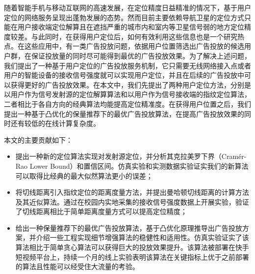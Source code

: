\begin{cabstract}
  随着智能手机与移动互联网的高速发展，在定位精度日益精准的情况下，基于用户定位的网络服务呈现出蓬勃发展的态势。然而目前主要依赖导航卫星的定位方式只能在用户接收端定位解算且在遮挡严重的城市内和室内等卫星信号弱的地方定位精度较差。与此同时，在获得用户定位后，如何有效利用这些信息也是一个研究热点。在这些应用中，有一类广告投放问题，依据用户位置筛选出广告投放的候选用户群，在保证投放量的同时尽可能得到最优的广告投放效果。为了解决上述问题，我们提出了一种基于用户定位的广告投放服务机制，它只需要无线网络接入点或者用户的智能设备的接收信号强度就可以实现用户定位，并且在后续的广告投放中可以获得更好的广告投放效果。在本文中，我们先提出了两种用户定位方法，分别是以用户作为信号发射源的定位解算算法和以用户作为信号接收端的指纹定位算法，二者相比于各自方向的经典算法均能提高定位精准度。在获得用户位置之后，我们提出一种基于凸优化的保量推荐下的最优广告投放算法，在提高广告投放效果的同时还有较低的在线计算复杂度。

  本文的主要贡献如下：
  \begin{itemize}
    \item 提出一种新的定位算法实现对发射源定位，并分析其克拉美罗下界（Cram\'{e}r-Rao Lower Bound）和置信区间。仿真实验和实测数据实验证实我们的新算法可以取得比经典的最大似然算法更小的误差；
    \item 将切线距离引入指纹定位的距离度量方法，并提出曼哈顿切线距离的计算方法及其近似算法。通过在校园内实地采集的接收信号强度数据上开展实验，验证了切线距离相比于简单距离度量方式可以提高定位精度；
    \item 给出一种保量推荐下的最优广告投放算法，基于凸优化原理推导出广告投放方案，并介绍一些工程实现细节增强算法的稳健性和适用性。仿真实验证实了该算法相比于简单贪心算法可以获得巨大的投放效果提升。该算法被部署在快手短视频平台上，持续一个月的线上实验表明该算法在关键指标上优于之前部署的算法且性能可以经受住大流量的考验。
  \end{itemize}


\end{cabstract}


